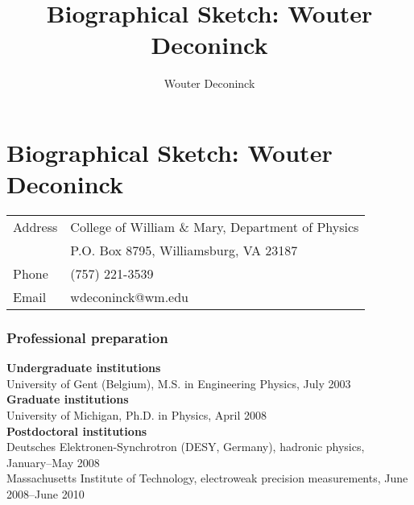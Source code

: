 \documentclass[11pt,letterpaper]{article}
\title{Biographical Sketch: Wouter Deconinck}
\author{Wouter Deconinck}
\begin{document}


\section*{Biographical Sketch: Wouter Deconinck}

\begin{tabular}{ll}
Address & College of William \& Mary, Department of Physics \\
        & P.O. Box 8795, Williamsburg, VA 23187 \\
Phone   & (757) 221-3539 \\
Email   & wdeconinck@wm.edu \\
\end{tabular}


\subsubsection*{Professional preparation}

\textbf{Undergraduate institutions} \\
University of Gent (Belgium), M.S. in Engineering Physics, July 2003 \\
%
\textbf{Graduate institutions} \\
University of Michigan, Ph.D. in Physics, April 2008 \\
%
\textbf{Postdoctoral institutions} \\
Deutsches Elektronen-Synchrotron (DESY, Germany), hadronic physics, January--May 2008 \\
Massachusetts Institute of Technology, electroweak precision measurements, June 2008--June 2010
\end{document}
